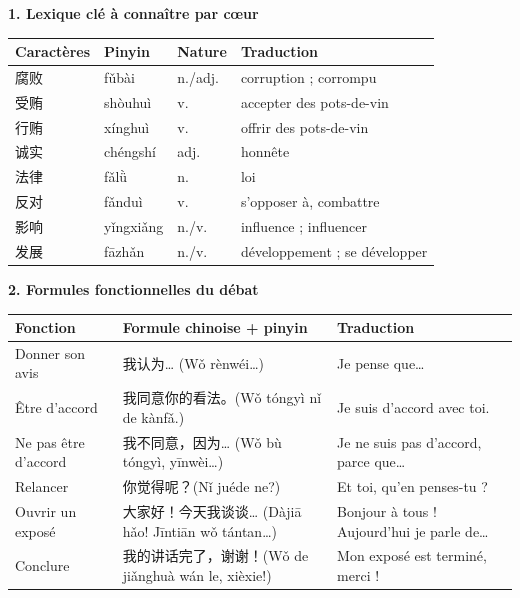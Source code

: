 \documentclass[11pt]{article}
\begin{document}
\begin{bilan}
\textbf{1. Lexique clé à connaître par cœur}
\begin{center}
\begin{tabularx}{\linewidth}{|X|X|X|X|}
\hline
\rowcolor{popblueL} Caractères & Pinyin & Nature & Traduction \\
\hline
腐败 & fǔbài & n./adj. & corruption ; corrompu \\
\hline
受贿 & shòuhuì & v. & accepter des pots-de-vin \\
\hline
行贿 & xínghuì & v. & offrir des pots-de-vin \\
\hline
诚实 & chéngshí & adj. & honnête \\
\hline
法律 & fǎlǜ & n. & loi \\
\hline
反对 & fǎnduì & v. & s'opposer à, combattre \\
\hline
影响 & yǐngxiǎng & n./v. & influence ; influencer \\
\hline
发展 & fāzhǎn & n./v. & développement ; se développer \\
\hline
\end{tabularx}
\end{center}

\textbf{2. Formules fonctionnelles du débat}
\begin{center}
\begin{tabularx}{\linewidth}{|X|X|X|}
\hline
\rowcolor{popblueL} Fonction & Formule chinoise + pinyin & Traduction \\
\hline
Donner son avis & 我认为… (Wǒ rènwéi…) & Je pense que… \\
\hline
Être d'accord & 我同意你的看法。(Wǒ tóngyì nǐ de kànfǎ.) & Je suis d'accord avec toi. \\
\hline
Ne pas être d'accord & 我不同意，因为… (Wǒ bù tóngyì, yīnwèi…) & Je ne suis pas d'accord, parce que… \\
\hline
Relancer & 你觉得呢？(Nǐ juéde ne?) & Et toi, qu'en penses-tu ? \\
\hline
Ouvrir un exposé & 大家好！今天我谈谈… (Dàjiā hǎo! Jīntiān wǒ tántan…) & Bonjour à tous ! Aujourd'hui je parle de… \\
\hline
Conclure & 我的讲话完了，谢谢！(Wǒ de jiǎnghuà wán le, xièxie!) & Mon exposé est terminé, merci ! \\
\hline
\end{tabularx}
\end{center}


\end{bilan}
\end{document}
